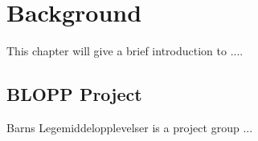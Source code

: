 \chapter{Background}
\label{background}


This chapter will give a brief introduction to ....


\section{BLOPP Project}
Barns Legemiddelopplevelser is a project group ...
